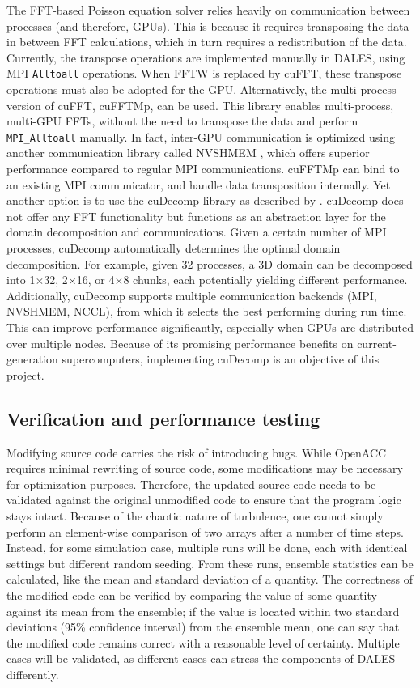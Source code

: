 The FFT-based Poisson equation solver relies heavily on communication between processes (and therefore, GPUs). This is because it requires transposing the data in between FFT calculations, which in turn requires a redistribution of the data. Currently, the transpose operations are implemented manually in DALES, using MPI \texttt{Alltoall} operations. When FFTW is replaced by cuFFT, these transpose operations must also be adopted for the GPU. Alternatively, the multi-process version of cuFFT, cuFFTMp, can be used. This library enables multi-process, multi-GPU FFTs, without the need to transpose the data and perform \texttt{MPI\_Alltoall} manually. In fact, inter-GPU communication is optimized using another communication library called NVSHMEM \citep{nvidiadeveloperNVSHMEM}, which offers superior performance compared to regular MPI communications. cuFFTMp can bind to an existing MPI communicator, and handle data transposition internally. Yet another option is to use the cuDecomp library as described by \citet{romeroDistributedmemorySimulationsTurbulent2022}. cuDecomp does not offer any FFT functionality but functions as an abstraction layer for the domain decomposition and communications. Given a certain number of MPI processes, cuDecomp automatically determines the optimal domain decomposition. For example, given 32 processes, a 3D domain can be decomposed into 1$\times$32, 2$\times$16, or 4$\times$8 chunks, each potentially yielding different performance. Additionally, cuDecomp supports multiple communication backends (MPI, NVSHMEM, NCCL), from which it selects the best performing during run time. This can improve performance significantly, especially when GPUs are distributed over multiple nodes. Because of its promising performance benefits on current-generation supercomputers, implementing cuDecomp is an objective of this project.

\newpage

\subsection{Verification and performance testing}
Modifying source code carries the risk of introducing bugs. While OpenACC requires minimal rewriting of source code, some modifications may be necessary for optimization purposes. Therefore, the updated source code needs to be validated against the original unmodified code to ensure that the program logic stays intact. Because of the chaotic nature of turbulence, one cannot simply perform an element-wise comparison of two arrays after a number of time steps. Instead, for some simulation case, multiple runs will be done, each with identical settings but different random seeding. From these runs, ensemble statistics can be calculated, like the mean and standard deviation of a quantity. The correctness of the modified code can be verified by comparing the value of some quantity against its mean from the ensemble; if the value is located within two standard deviations (95\% confidence interval) from the ensemble mean, one can say that the modified code remains correct with a reasonable level of certainty. Multiple cases will be validated, as different cases can stress the components of DALES differently. 

